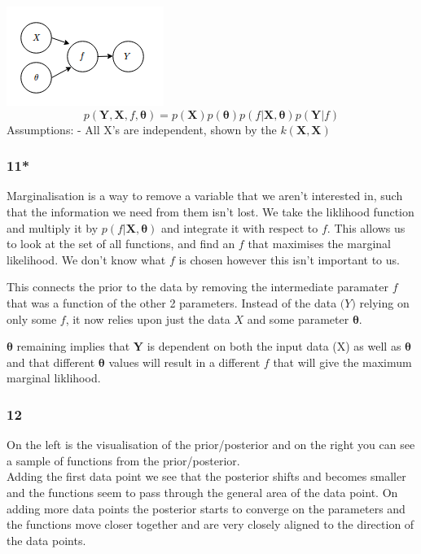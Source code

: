 \documentclass[11pt]{article}
\makeatletter
\def\maxwidth{\ifdim\Gin@nat@width>\linewidth\linewidth
    \else\Gin@nat@width\fi}
\let\Oldincludegraphics\includegraphics
\renewcommand{\includegraphics}[1]{\Oldincludegraphics[width=.8\maxwidth]{#1}}
\makeatother
\begin{document}
\includegraphics{q10.png}
\[p(\boldsymbol{Y}, \boldsymbol{X}, f, \boldsymbol{\theta}) = p(\boldsymbol{X}) p(\boldsymbol{\theta}) p(f|\boldsymbol{X},\boldsymbol{\theta})p(\boldsymbol{Y}|f)\]
Assumptions: - All X's are independent, shown by the
\(k(\pmb X, \pmb X)\)

    \subsubsection{11*}\label{section}

Marginalisation is a way to remove a variable that we aren't interested
in, such that the information we need from them isn't lost. We take the
liklihood function and multiply it by
\(p(f|\boldsymbol{X},\boldsymbol{\theta})\) and integrate it with
respect to \(f\). This allows us to look at the set of all functions,
and find an \(f\) that maximises the marginal likelihood. We don't know
what \(f\) is chosen however this isn't important to us.

This connects the prior to the data by removing the intermediate
paramater \(f\) that was a function of the other 2 parameters. Instead
of the data \(\boldsymbol(Y)\) relying on only some \(f\), it now relies
upon just the data \(X\) and some parameter \(\boldsymbol{\theta}\).

\(\boldsymbol{\theta}\) remaining implies that \(\boldsymbol{Y}\) is
dependent on both the input data (X) as well as \(\boldsymbol{\theta}\)
and that different \(\boldsymbol{\theta}\) values will result in a
different \(f\) that will give the maximum marginal liklihood.

    \subsubsection{12}\label{section}

On the left is the visualisation of the prior/posterior and on the right
you can see a sample of functions from the prior/posterior.\\
Adding the first data point we see that the posterior shifts and becomes
smaller and the functions seem to pass through the general area of the
data point. On adding more data points the posterior starts to converge
on the parameters and the functions move closer together and are very
closely aligned to the direction of the data points.
\end{document}
